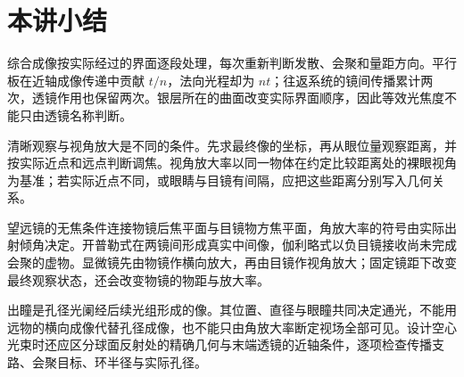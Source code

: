 \section{本讲小结}

综合成像按实际经过的界面逐段处理，每次重新判断发散、会聚和量距方向。平行板在近轴成像传递中贡献 $t/n$，法向光程却为 $nt$；往返系统的镜间传播累计两次，透镜作用也保留两次。银层所在的曲面改变实际界面顺序，因此等效光焦度不能只由透镜名称判断。

清晰观察与视角放大是不同的条件。先求最终像的坐标，再从眼位量观察距离，并按实际近点和远点判断调焦。视角放大率以同一物体在约定比较距离处的裸眼视角为基准；若实际近点不同，或眼睛与目镜有间隔，应把这些距离分别写入几何关系。

望远镜的无焦条件连接物镜后焦平面与目镜物方焦平面，角放大率的符号由实际出射倾角决定。开普勒式在两镜间形成真实中间像，伽利略式以负目镜接收尚未完成会聚的虚物。显微镜先由物镜作横向放大，再由目镜作视角放大；固定镜距下改变最终观察状态，还会改变物镜的物距与放大率。

出瞳是孔径光阑经后续光组形成的像。其位置、直径与眼瞳共同决定通光，不能用远物的横向成像代替孔径成像，也不能只由角放大率断定视场全部可见。设计空心光束时还应区分球面反射处的精确几何与末端透镜的近轴条件，逐项检查传播支路、会聚目标、环半径与实际孔径。

